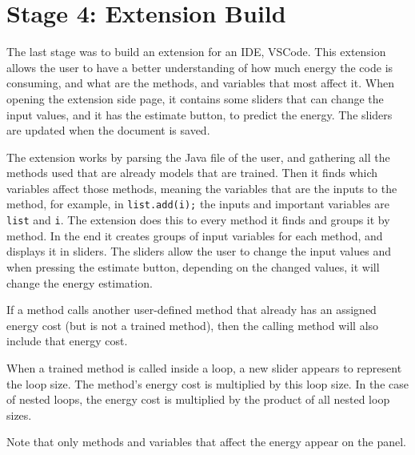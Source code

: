 \section{Stage 4: Extension Build} \label{sec:work_stage4_extension_build}

The last stage was to build an extension for an IDE, VSCode. This extension allows the user to have a better understanding of how much energy the code is consuming, and what are the methods, and variables that most affect it.
When opening the extension side page, it contains some sliders that can change the input values, and it has the estimate button, to predict the energy.
The sliders are updated when the document is saved.%

The extension works by parsing the Java file of the user, and gathering all the methods used that are already models that are trained. Then it finds which variables affect those methods, meaning the variables that are the inputs to the method, for example, in \texttt{list.add(i);}  the inputs and important variables are \texttt{list} and \texttt{i}.
The extension does this to every method it finds and groups it by method. In the end it creates groups of input variables for each method, and displays it in sliders. The sliders allow the user to change the input values and when pressing the estimate button, depending on the changed values, it will change the energy estimation.

If a method calls another user-defined method that already has an assigned energy cost (but is not a trained method), then the calling method will also include that energy cost.

When a trained method is called inside a loop, a new slider appears to represent the loop size. The method’s energy cost is multiplied by this loop size. In the case of nested loops, the energy cost is multiplied by the product of all nested loop sizes.

Note that only methods and variables that affect the energy appear on the panel.


